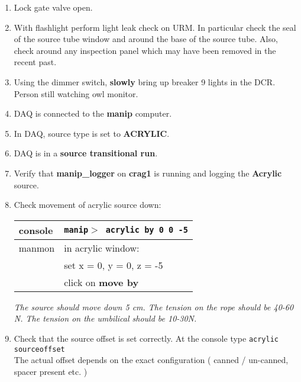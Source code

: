 \begin{enumerate}
 \item\checkbox Lock gate valve open.

 \item\checkbox With flashlight perform light leak check on URM.  In particular
   check the seal of the source tube window and around the base of the source tube.
   Also, check around any inspection panel which may have been removed in the recent past.

 \item\checkbox Using the dimmer switch, { \bf slowly } bring up breaker 9 lights in
   the DCR.  Person still watching owl monitor.


 \item\checkbox DAQ is connected to the {\bf manip} computer.

 \item \checkbox In DAQ, source type is set to {\bf ACRYLIC}.

 \item\checkbox DAQ is in a {\bf source transitional run}.

 \item \checkbox Verify that {\bf manip\_logger} on {\bf crag1}
                 is running and logging the {\bf Acrylic}  source.

 \item\checkbox Check movement of acrylic source down:
  \begin{center}
  \begin{tabular}{|l|l|}
  \hline
  console & {\tt manip$>$ acrylic by 0 0 -5} \\
  \hline
  manmon  & in acrylic window: \\
          & set x = 0, y = 0, z = -5\\
          & click on {\bf move by} \\
  \hline
  \end{tabular}
  \end{center}

  \small
  {\em
    The source should move down 5 cm.  The tension on the rope
    should be 40-60 N.  The tension on the umbilical should be
    10-30N.
  }
  \normalsize


 \item\checkbox Check that the source offset is set correctly.
   At the console type
 {\tt acrylic sourceoffset } \\
  The actual offset depends on the exact configuration ( canned / un-canned, spacer present etc. )  


\end{enumerate}
